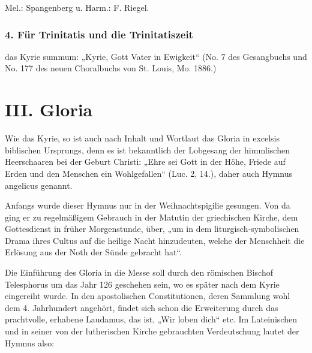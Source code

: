 Mel.: Spangenberg u. Harm.: F. Riegel.








\subsection{4. Für Trinitatis und die Trinitatiszeit}

das Kyrie summum: „Kyrie, Gott Vater in Ewigkeit“ (No. 7 des Gesangbuchs und No. 177 des neuen Choralbuchs von St. Louis, Mo. 1886.)

\chapter{III. Gloria}


Wie das Kyrie, so ist auch nach Inhalt und Wortlaut das Gloria in excelsis biblischen Ursprungs, denn es ist bekanntlich der Lobgesang der himmlischen Heerschaaren bei der Geburt Christi: „Ehre sei Gott in der Höhe, Friede auf Erden und den Menschen ein Wohlgefallen“ (Luc. 2, 14.), daher auch Hymnus angelicus genannt.

Anfangs wurde dieser Hymnus nur in der Weihnachtspigilie gesungen. Von da ging er zu regelmäßigem Gebrauch in der Matutin der griechischen Kirche, dem Gottesdienst in früher Morgenstunde, über, „um in dem liturgisch-symbolischen Drama ihres Cultus auf die heilige Nacht hinzudeuten, welche der Menschheit die Erlösung aus der Noth der Sünde gebracht hat“.

Die Einführung des Gloria in die Messe soll durch den römischen Bischof Telesphorus um das Jahr 126 geschehen sein, wo es später nach dem Kyrie eingereiht wurde. In den apostolischen Constitutionen, deren Sammlung wohl dem 4. Jahrhundert angehört, findet sich schon die Erweiterung durch das prachtvolle, erhabene Laudamus, das ist, „Wir loben dich“ etc. Im Lateinischen und in seiner von der lutherischen Kirche gebrauchten Verdeutschung lautet der Hymnus also:

